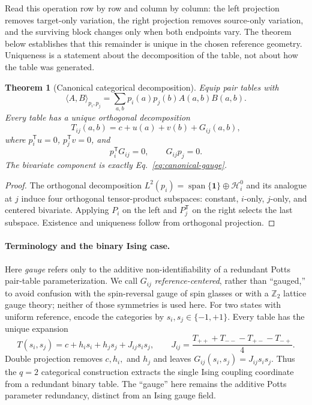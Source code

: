 \documentclass[10pt]{article}
\newcommand{\Span}{\operatorname{span}}
\newtheorem{theorem}{Theorem}[section]
\theoremstyle{definition}
\theoremstyle{remark}
\begin{document}
Read this operation row by row and column by column: the left projection removes target-only
variation, the right projection removes source-only variation, and the surviving block changes
only when both endpoints vary.  The theorem below establishes that this remainder is unique in the
chosen reference geometry.  Uniqueness is a statement about the decomposition of the table, not
about how the table was generated.

\begin{theorem}[Canonical categorical decomposition]
\label{thm:pair-anova}
Equip pair tables with
\begin{equation}
\langle A,B\rangle_{p_i,p_j}
=\sum_{a,b}p_i(a)p_j(b)A(a,b)B(a,b).
\end{equation}
Every table has a unique orthogonal decomposition
\begin{equation}
T_{ij}(a,b)=c+u(a)+v(b)+G_{ij}(a,b),
\label{eq:pair-decomposition}
\end{equation}
where $p_i^{\mathsf T}u=0$, $p_j^{\mathsf T}v=0$, and
\begin{equation}
p_i^{\mathsf T}G_{ij}=0,
\qquad
G_{ij}p_j=0.
\label{eq:zero-marginals}
\end{equation}
The bivariate component is exactly Eq.~\ref{eq:canonical-gauge}.
\end{theorem}

\begin{proof}
The orthogonal decomposition
$L^2(p_i)=\Span\{\mathbf1\}\oplus\mathcal H_i^0$ and its analogue at $j$ induce four
orthogonal tensor-product subspaces: constant, $i$-only, $j$-only, and centered bivariate.
Applying $P_i$ on the left and $P_j^{\mathsf T}$ on the right selects the last subspace.
Existence and uniqueness follow from orthogonal projection.
\end{proof}

\paragraph{Terminology and the binary Ising case.}
Here \emph{gauge} refers only to the additive non-identifiability of a redundant Potts pair-table
parameterization.  We call $G_{ij}$ \emph{reference-centered}, rather than ``gauged,'' to avoid
confusion with the spin-reversal gauge of spin glasses or with a $\mathbb Z_2$ lattice gauge
theory; neither of those symmetries is used here.  For two states with uniform reference, encode
the categories by $s_i,s_j\in\{-1,+1\}$.  Every table has the unique expansion
\begin{equation}
T(s_i,s_j)=c+h_i s_i+h_j s_j+J_{ij}s_is_j,
\qquad
J_{ij}=\frac{T_{++}+T_{--}-T_{+-}-T_{-+}}{4}.
\label{eq:binary-ising-decomposition}
\end{equation}
Double projection removes $c,h_i,$ and $h_j$ and leaves
$G_{ij}(s_i,s_j)=J_{ij}s_is_j$.  Thus the $q=2$ categorical construction extracts the single
Ising coupling coordinate from a redundant binary table.  The ``gauge'' here remains the additive
Potts parameter redundancy, distinct from an Ising gauge field.
\end{document}
